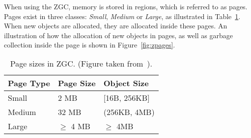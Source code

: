 When using the ZGC, memory is stored in regions, which is referred to as pages. Pages exist in three classes: \textit{Small}, \textit{Medium} or \textit{Large}, as illustrated in Table~\ref{table:zpage_sizes}. When new objects are allocated, they are allocated inside these pages. An illustration of how the allocation of new objects in pages, as well as garbage collection inside the page is shown in Figure~\ref{fig:zpages}.

\begin{table}[H]
\centering
\begin{tabular}{lllll}
\hline
Page Type & Page Size          & \multicolumn{3}{l}{Object Size}        \\ \hline
Small     & 2 MB                & \multicolumn{3}{l}{{[}16B, 256KB{]}}   \\
Medium    & 32 MB               & \multicolumn{3}{l}{(256KB, 4MB)}       \\
Large     & $\geq$ 4 MB & \multicolumn{3}{l}{$\geq$ 4MB} \\ \hline
\end{tabular}
\caption{Page sizes in ZGC. (Figure taken from~\cite{zpage_size_table}). }
\label{table:zpage_sizes}
\end{table}

